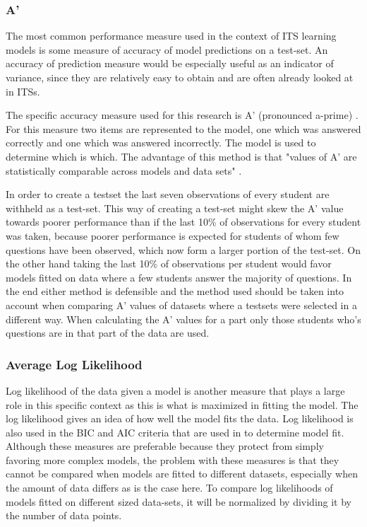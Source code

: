 \documentclass{scrartcl}
\begin{document}
\subsubsection{A'}
The most common performance measure used in the context of ITS learning models is some measure of accuracy of model predictions on a test-set. An accuracy of prediction measure would be especially useful as an indicator of variance, since they are relatively easy to obtain and are often already looked at in ITSs. 

The specific accuracy measure used for this research is A' (pronounced a-prime) \cite{modelreview}. For this measure two items are represented to the model, one which was answered correctly and one which was answered incorrectly. The model is used to determine which is which. The advantage of this method is that "values of A' are statistically comparable across models and data sets" \cite{modelreview}.

In order to create a testset the last seven observations of every student are withheld as a test-set. This way of creating a test-set might skew the A' value towards poorer performance than if the last 10\% of observations for every student was taken, because poorer performance is expected for students of whom few questions have been observed, which now form a larger portion of the test-set. On the other hand taking the last 10\% of observations per student would favor models fitted on data where a few students answer the majority of questions. In the end either method is defensible and the method used should be taken into account when comparing A' values of datasets where a testsets were selected in a different way. When calculating the A' values for a part only those students who's questions are in that part of the data are used.

\subsubsection{Average Log Likelihood}
Log likelihood of the data given a model is another measure that plays a large role in this specific context as this is what is maximized in fitting the model. The log likelihood gives an idea of how well the model fits the data. Log likelihood is also used in the BIC and AIC criteria that are used in \cite{lfa} to determine model fit. Although these measures are preferable because they protect from simply favoring more complex models, the problem with these measures is that they cannot be compared when models are fitted to different datasets, especially when the amount of data differs as is the case here.  To compare log likelihoods of models fitted on different sized data-sets, it will be normalized by dividing it by the number of data points.
\end{document}
